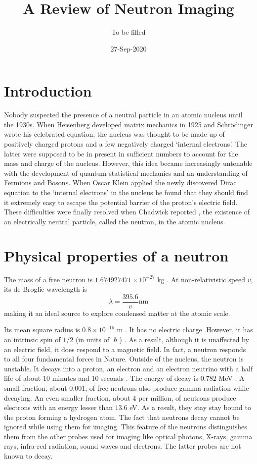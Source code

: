 \documentclass{article}
\title{A Review of Neutron Imaging}
\author{To be filled}
\date{27-Sep-2020}
\numberwithin{equation}{section}
\begin{document}
\maketitle
\section{Introduction}\label{s1}
Nobody suspected the presence of a neutral particle in an atomic nucleus until
the 1930s. When Heisenberg developed matrix mechanics in 1925 and 
Schr\"{o}dinger wrote his celebrated equation, the nucleus was thought to be
made up of positively charged protons and a few negatively charged `internal
electrons'. The latter were supposed to be in present in sufficient numbers to
account for the mass and charge of the nucleus. However, this idea became
increasingly untenable with the development of quantum statistical mechanics
and an understanding of Fermions and Bosons. When Oscar Klein 
\cite{klein1929reflexion} applied the newly discovered Dirac equation to the
`internal electrons' in the nucleus he found that they should find it 
extremely easy to escape the potential barrier of the proton's electric field.
These difficulties were finally resolved when Chadwick reported 
\cite{chadwick1932existence}, the existence of an electrically neutral particle, called the neutron, in the atomic nucleus. 

\section{Physical properties of a neutron}\label{s2}
The mass of a free neutron is $1.674927471 \times 10^{-27}$ kg
\cite{taylor2007nist}. At non-relativistic speed $v$, its de Broglie wavelength
is \cite{anderson2008neutron}
\begin{equation}\label{s2e1}
\lambda = \frac{395.6}{v} \text{nm}
\end{equation}
making it an ideal source to explore condensed matter at the atomic scale.

Its mean square radius is $0.8 \times 10^{-15}$ m
\cite{bogdan2015particles}. It has no electric charge. However, it has
an intrinsic spin of $1/2$ (in units of $\hslash$)
\cite{basdevant2005fundamentals}. As a result, although it is unaffected by 
an electric field, it does respond to a magnetic field. In fact, a neutron 
responds to all four fundamental forces in Nature. Outside of
the nucleus, the neutron is unstable. It decays into a proton, an electron and
an electron neutrino with a half life of about $10$ minutes and $10$ seconds
\cite{Nakamura_2010}. The energy of decay is $0.782$ MeV \cite{heyde2004basic}.
A small fraction, about $0.001$, of free neutrons also produce gamma radiation 
while decaying. An even smaller fraction, about $4$ per million, of neutrons
produce electrons with an energy lesser than $13.6$ eV. As a result, they
stay stay bound to the proton forming a hydrogen atom. The fact that neutrons
decay cannot be ignored while using them for imaging. This feature of the
neutrons distinguishes them from the other probes used for imaging like optical
photons, X-rays, gamma rays, infra-red radiation, sound waves and electrons. 
The latter probes are not known to decay.
\end{document}
